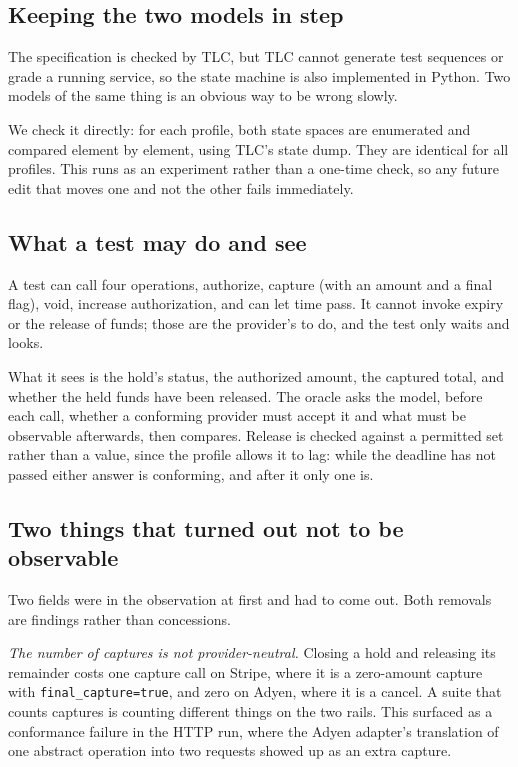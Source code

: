\documentclass[conference]{IEEEtran}
\newcommand{\code}[1]{\texttt{\small #1}}
\begin{document}
\subsection{Keeping the two models in step}

The specification is checked by TLC, but TLC cannot generate test sequences or
grade a running service, so the state machine is also implemented in Python. Two
models of the same thing is an obvious way to be wrong slowly.

We check it directly: for each profile, both state spaces are enumerated and
compared element by element, using TLC's state dump. They are identical for all
\equivalenceprofiles{} profiles. This runs as an experiment rather than a
one-time check, so any future edit that moves one and not the other fails
immediately.

\subsection{What a test may do and see}

A test can call four operations, authorize, capture (with an amount and a
final flag), void, increase authorization, and can let time pass. It cannot
invoke expiry or the release of funds; those are the provider's to do, and the
test only waits and looks.

What it sees is the hold's status, the authorized amount, the captured total,
and whether the held funds have been released. The oracle asks the model, before
each call, whether a conforming provider must accept it and what must be
observable afterwards, then compares. Release is checked against a permitted set
rather than a value, since the profile allows it to lag: while the deadline has
not passed either answer is conforming, and after it only one is.

\subsection{Two things that turned out not to be observable}
\label{sec:observability}

Two fields were in the observation at first and had to come out. Both removals
are findings rather than concessions.

\emph{The number of captures is not provider-neutral.} Closing a hold and
releasing its remainder costs one capture call on Stripe, where it is a
zero-amount capture with \code{final\_capture=true}, and zero on Adyen, where it
is a cancel. A suite that counts captures is counting different things on the
two rails. This surfaced as a conformance failure in the HTTP run, where the
Adyen adapter's translation of one abstract operation into two requests showed up
as an extra capture.
\end{document}
